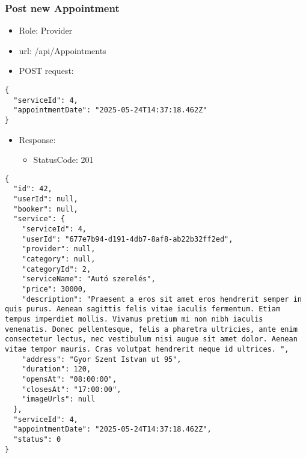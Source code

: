 \documentclass[11pt]{article}
\begin{document}
\subsubsection{Post new Appointment}
\label{sec:org3ae3d31}
\begin{itemize}
\item Role: Provider
\item url: /api/Appointments
\item POST request:
\end{itemize}
\begin{verbatim}
{
  "serviceId": 4,
  "appointmentDate": "2025-05-24T14:37:18.462Z"
}
\end{verbatim}
\begin{itemize}
\item Response:
\begin{itemize}
\item StatusCode: 201
\end{itemize}
\end{itemize}
\begin{verbatim}
{
  "id": 42,
  "userId": null,
  "booker": null,
  "service": {
    "serviceId": 4,
    "userId": "677e7b94-d191-4db7-8af8-ab22b32ff2ed",
    "provider": null,
    "category": null,
    "categoryId": 2,
    "serviceName": "Autó szerelés",
    "price": 30000,
    "description": "Praesent a eros sit amet eros hendrerit semper in quis purus. Aenean sagittis felis vitae iaculis fermentum. Etiam tempus imperdiet mollis. Vivamus pretium mi non nibh iaculis venenatis. Donec pellentesque, felis a pharetra ultricies, ante enim consectetur lectus, nec vestibulum nisi augue sit amet dolor. Aenean vitae tempor mauris. Cras volutpat hendrerit neque id ultrices. ",
    "address": "Gyor Szent Istvan ut 95",
    "duration": 120,
    "opensAt": "08:00:00",
    "closesAt": "17:00:00",
    "imageUrls": null
  },
  "serviceId": 4,
  "appointmentDate": "2025-05-24T14:37:18.462Z",
  "status": 0
}
\end{verbatim}
\end{document}
